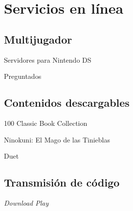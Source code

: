 
\section{Servicios en línea}
\subsection{Multijugador}
\begin{frame}{Servidores para Nintendo DS}

\end{frame}

\begin{frame}{Preguntados}

\end{frame}

\subsection{Contenidos descargables}
\begin{frame}{100 Classic Book Collection}

\end{frame}

\begin{frame}{Ninokuni: El Mago de las Tinieblas}

\end{frame}

\begin{frame}{Duet}

\end{frame}

\subsection{Transmisión de código}
\begin{frame}{\textit{Download Play}}

\end{frame}
